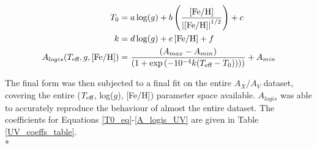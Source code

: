\documentclass[12pt, a4paper]{report}
\begin{document}
\begin{align}
T_{\textnormal{0}} &= a\log(g) + b\left(\frac{\left[\textnormal{Fe/H}\right]}{\left|\left[\textnormal{Fe/H}\right]\right|^{1/2}}\right) + c \label{T0_eq}\\
k &= d\log(g) + e\left[\textnormal{Fe/H}\right] + f \label{decay_const_eq}\\
A_{logis}(T_{\textnormal{eff}},g,\left[\textnormal{Fe/H}\right]) &= \frac{(A_{max}-A_{min})}{( 1 + \exp{(-10^{-4} k(T_{\textnormal{eff}}-T_{\textnormal{0}})) ) )}} + A_{min} \label{A_logis_UV}
\end{align}

The final form was then subjected to a final fit on the entire $A_{X}/A_{V}$ dataset, covering the entire ($T_{\textnormal{eff}}$,  log($g$), [Fe/H]) parameter space available. $A_{logis}$ was able to accurately reproduce the behaviour of almost the entire dataset. The coefficients for Equations \ref{T0_eq}-\ref{A_logis_UV} are given in Table \ref{UV_coeffs_table}. \\*
\end{document}
